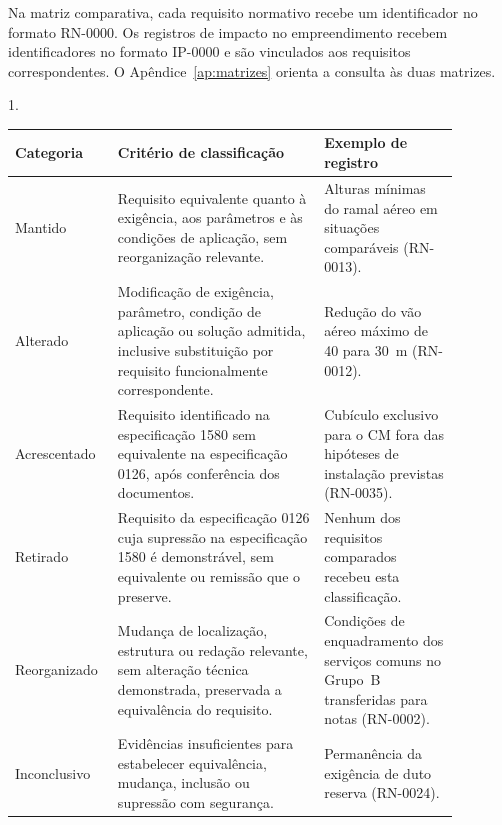 Na matriz comparativa, cada requisito normativo recebe um identificador no formato RN-0000. Os registros de impacto no empreendimento recebem identificadores no formato IP-0000 e são vinculados aos requisitos correspondentes. O Apêndice~\ref{ap:matrizes} orienta a consulta às duas matrizes.

\begin{quadro}[htbp]
  \centering
  \begin{Spacing}{1.}
    \caption{Classificação das alterações normativas}
    \label{qua:classificacao-normativa}
  \end{Spacing}
  {\small
  \renewcommand{\arraystretch}{1.2}
  \setlength{\tabcolsep}{4pt}
  \begin{tabular}{|>{\raggedright\arraybackslash}p{0.17\linewidth}|>{\raggedright\arraybackslash}p{0.43\linewidth}|>{\raggedright\arraybackslash}p{0.28\linewidth}|}
    \hline
    \textbf{Categoria} & \textbf{Critério de classificação} & \textbf{Exemplo de registro} \\\hline
    Mantido & Requisito equivalente quanto à exigência, aos parâmetros e às condições de aplicação, sem reorganização relevante. & Alturas mínimas do ramal aéreo em situações comparáveis (RN-0013). \\\hline
    Alterado & Modificação de exigência, parâmetro, condição de aplicação ou solução admitida, inclusive substituição por requisito funcionalmente correspondente. & Redução do vão aéreo máximo de 40 para 30~m (RN-0012). \\\hline
    Acrescentado & Requisito identificado na especificação 1580 sem equivalente na especificação 0126, após conferência dos documentos. & Cubículo exclusivo para o CM fora das hipóteses de instalação previstas (RN-0035). \\\hline
    Retirado & Requisito da especificação 0126 cuja supressão na especificação 1580 é demonstrável, sem equivalente ou remissão que o preserve. & Nenhum dos requisitos comparados recebeu esta classificação. \\\hline
    Reorganizado & Mudança de localização, estrutura ou redação relevante, sem alteração técnica demonstrada, preservada a equivalência do requisito. & Condições de enquadramento dos serviços comuns no Grupo~B transferidas para notas (RN-0002). \\\hline
    Inconclusivo & Evidências insuficientes para estabelecer equivalência, mudança, inclusão ou supressão com segurança. & Permanência da exigência de duto reserva (RN-0024). \\\hline
  \end{tabular}}
\end{quadro}

